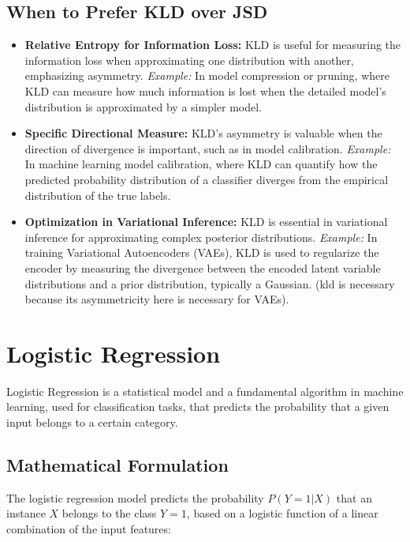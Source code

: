 \documentclass[12pt]{article}
\begin{document}
\subsection{When to Prefer KLD over JSD}

\begin{itemize}
    \item \textbf{Relative Entropy for Information Loss:} KLD is useful for measuring the information loss when approximating one distribution with another, emphasizing asymmetry. \textit{Example:} In model compression or pruning, where KLD can measure how much information is lost when the detailed model’s distribution is approximated by a simpler model.
    
    \item \textbf{Specific Directional Measure:} KLD's asymmetry is valuable when the direction of divergence is important, such as in model calibration. \textit{Example:} In machine learning model calibration, where KLD can quantify how the predicted probability distribution of a classifier diverges from the empirical distribution of the true labels.
    
    \item \textbf{Optimization in Variational Inference:} KLD is essential in variational inference for approximating complex posterior distributions. \textit{Example:} In training Variational Autoencoders (VAEs), KLD is used to regularize the encoder by measuring the divergence between the encoded latent variable distributions and a prior distribution, typically a Gaussian. (kld is necessary because its asymmetricity here is necessary for VAEs). 
\end{itemize}
\section{Logistic Regression}

Logistic Regression is a statistical model and a fundamental algorithm in machine learning, used for classification tasks, that predicts the probability that a given input belongs to a certain category.

\subsection{Mathematical Formulation}

The logistic regression model predicts the probability \( P(Y=1|X) \) that an instance \( X \) belongs to the class \( Y=1 \), based on a logistic function of a linear combination of the input features:
\end{document}
